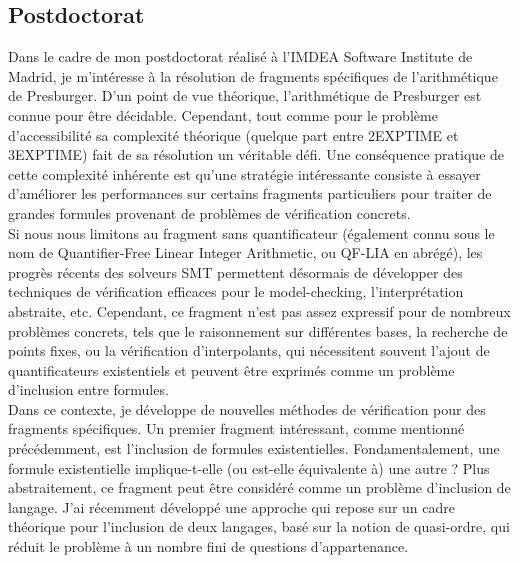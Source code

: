 \subsection{Postdoctorat}
\vspace{10pt}

Dans le cadre de mon postdoctorat réalisé à l'IMDEA Software Institute de
Madrid, je m'intéresse à la résolution de fragments spécifiques de
l'arithmétique de Presburger. D'un point de vue théorique, l'arithmétique de
Presburger est connue pour être décidable. Cependant, tout comme pour le
problème d'accessibilité sa complexité théorique (quelque part entre 2EXPTIME et
3EXPTIME) fait de sa résolution un véritable défi. Une conséquence pratique de
cette \og complexité inhérente \fg est qu'une stratégie intéressante consiste à
essayer d'améliorer les performances sur certains fragments particuliers pour
traiter de grandes formules provenant de problèmes de vérification concrets.\\

Si nous nous limitons au fragment sans quantificateur (également connu sous le
nom de Quantifier-Free Linear Integer Arithmetic, ou QF-LIA en abrégé), les
progrès récents des solveurs SMT permettent désormais de développer des
techniques de vérification efficaces pour le model-checking, l'interprétation
abstraite, etc. Cependant, ce fragment n'est pas assez expressif pour de
nombreux problèmes concrets, tels que le raisonnement sur différentes bases, la
recherche de points fixes, ou la vérification d'interpolants, qui nécessitent
souvent l'ajout de quantificateurs existentiels et peuvent être exprimés comme un
problème d'inclusion entre formules.\\

Dans ce contexte, je développe de nouvelles méthodes de vérification pour
des fragments spécifiques. Un premier fragment intéressant, comme mentionné
précédemment, est l'inclusion de formules existentielles. Fondamentalement,
une formule existentielle implique-t-elle (ou est-elle équivalente à) une autre
? Plus abstraitement, ce fragment peut être considéré comme un problème
d'inclusion de langage.  J'ai récemment développé une approche qui repose sur
un cadre théorique pour l'inclusion de deux langages, basé sur la notion de
quasi-ordre, qui réduit le problème à un nombre fini de questions
d'appartenance. 


